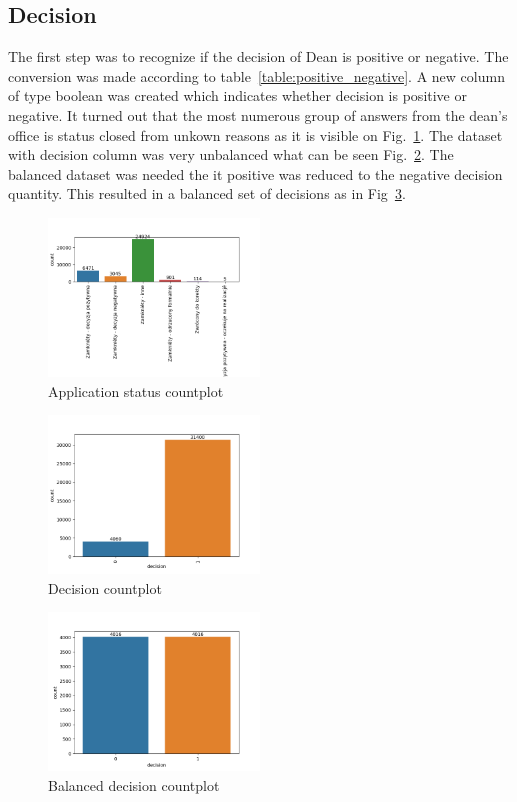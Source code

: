 \subsection{Decision}
The first step was to recognize if the decision of Dean is positive or negative.
The conversion was made according to table~\ref{table:positive_negative}.
A new column of type boolean was created which indicates whether decision is positive or negative.
It turned out that the most numerous group of answers from the dean's office is status closed from unkown reasons as it is visible on Fig.~\ref{fig:application_status_countplot}. The dataset with decision column was very unbalanced what can be seen Fig.~\ref{fig:decision_countplot}. The balanced dataset was needed the it positive was reduced to the negative decision quantity. This resulted in a balanced set of decisions as in Fig~\ref{fig:balanced_decision_countplot}.

\begin{figure}
    \includegraphics[width=0.5\textwidth]{img/application_status_countplot.png}
    \caption{Application status countplot}
    \label{fig:application_status_countplot}
\end{figure}

\begin{figure}
    \includegraphics[width=0.5\textwidth]{img/decision_countplot.png}
    \caption{Decision countplot}
    \label{fig:decision_countplot}
\end{figure}

\begin{figure}
    \includegraphics[width=0.5\textwidth]{img/balanced_decision_countplot.png}
    \caption{Balanced decision countplot}
    \label{fig:balanced_decision_countplot}
\end{figure}

